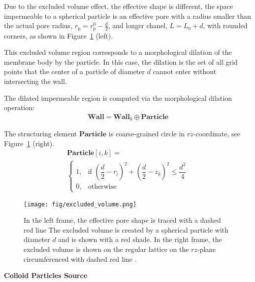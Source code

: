 \documentclass[10pt, a4paper]{article}
\begin{document}
\begin{multicols}{2}
Due to the excluded volume effect, the effective shape is different, the space impermeable to a spherical particle is an effective pore with a radius smaller than the actual pore radius, $r_{\text{p}} = r_{\text{p}}^{0} - \frac{d}{2}$, and longer chanel, $L = L_{0} + d$, with rounded corners, as shown in Figure~\ref{fig:excluded_volume} (left).

This excluded volume region corresponds to a morphological dilation of the membrane body by the particle. In this case, the dilation is the set of all grid points that the center of a particle of diameter $d$ cannot enter without intersecting the wall.

The dilated impermeable region is computed via the morphological dilation operation:
\begin{eqnarray}
    \textbf{Wall} = \textbf{Wall}_{0} \oplus \textbf{Particle}
\end{eqnarray}

The structuring element $\textbf{Particle}$ is coarse-grained circle in $rz$-coordinate, see Figure~\ref{fig:excluded_volume} (right).
\begin{equation}
    \begin{gathered}
        \textbf{Particle}[i,k] = \\
        \begin{cases}
                1, & \text{if } \left( \dfrac{d}{2} - r_i\right)^2 + \left( \dfrac{d}{2} - z_k\right)^2 \le \dfrac{d^2}{4} \\[5pt]
                0, & \text{otherwise}
            \end{cases}
    \end{gathered}
\end{equation}

\begin{figure}[H]
    \centering
    \texttt{[image: fig/excluded\_volume.png]}
    \caption{
        In the left frame, the effective pore shape is traced with a dashed red line
        The excluded volume is created by a spherical particle with diameter $d$ and is shown with a red shade.
        In the right frame, the excluded volume is shown on the regular lattice on the $rz$-plane circumferenced with dashed red line .
        }
    \label{fig:excluded_volume}
\end{figure}


\textbf{Colloid Particles Source}


\end{multicols}
\end{document}
